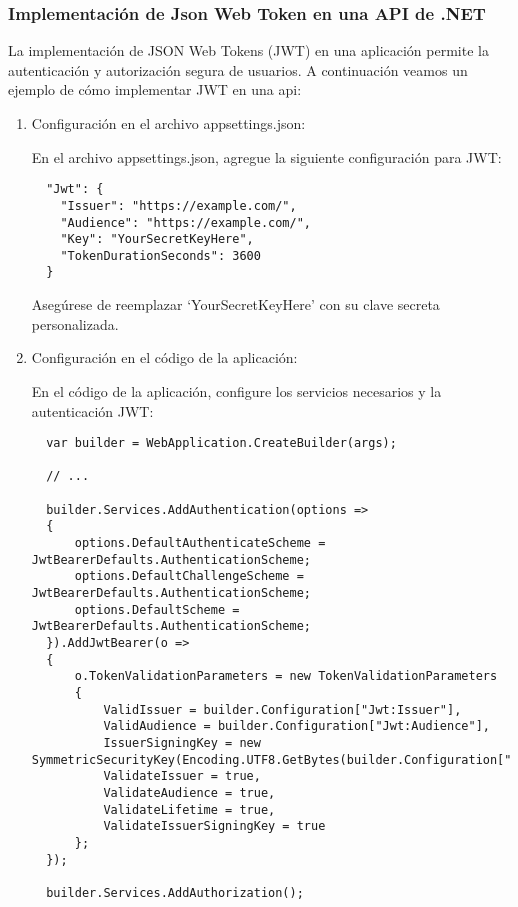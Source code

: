 \documentclass[executivepaper]{article}
\begin{document}
\subsubsection{Implementación de Json Web Token en una API de .NET}

La implementación de JSON Web Tokens (JWT) en una aplicación permite la autenticación y autorización segura de usuarios. A continuación veamos un ejemplo de cómo implementar JWT en una api:

\begin{enumerate}
  \item Configuración en el archivo appsettings.json:

  En el archivo appsettings.json, agregue la siguiente configuración para JWT:

 \begin{lstlisting}
  "Jwt": {
    "Issuer": "https://example.com/",
    "Audience": "https://example.com/",
    "Key": "YourSecretKeyHere",
    "TokenDurationSeconds": 3600
  }
\end{lstlisting}

  Asegúrese de reemplazar \enquote*{YourSecretKeyHere} con su clave secreta personalizada.

  \item Configuración en el código de la aplicación:

  En el código de la aplicación, configure los servicios necesarios y la autenticación JWT:

 \begin{lstlisting}
  var builder = WebApplication.CreateBuilder(args);

  // ...

  builder.Services.AddAuthentication(options =>
  {
      options.DefaultAuthenticateScheme = JwtBearerDefaults.AuthenticationScheme;
      options.DefaultChallengeScheme = JwtBearerDefaults.AuthenticationScheme;
      options.DefaultScheme = JwtBearerDefaults.AuthenticationScheme;
  }).AddJwtBearer(o =>
  {
      o.TokenValidationParameters = new TokenValidationParameters
      {
          ValidIssuer = builder.Configuration["Jwt:Issuer"],
          ValidAudience = builder.Configuration["Jwt:Audience"],
          IssuerSigningKey = new SymmetricSecurityKey(Encoding.UTF8.GetBytes(builder.Configuration["Jwt:Key"])),
          ValidateIssuer = true,
          ValidateAudience = true,
          ValidateLifetime = true,
          ValidateIssuerSigningKey = true
      };
  });

  builder.Services.AddAuthorization();


\end{lstlisting}
\end{enumerate}
\end{document}
